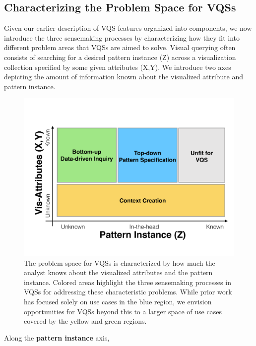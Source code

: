 \subsection{Characterizing the Problem Space for VQSs}
Given our earlier description of VQS features organized into components, we now introduce the three sensemaking processes by characterizing how they fit into different problem areas that VQSs are aimed to solve. Visual querying often consists of searching for a desired pattern instance (Z) across a visualization collection specified by some given attributes (X,Y). We introduce two axes depicting the amount of information known about the visualized attribute and pattern instance.%
\begin{figure}[h!]
  \centering
  \includegraphics[width=0.9\linewidth]{figures/2dmodel.pdf}
  \caption{The problem space for VQSs is characterized by how much the analyst knows about the visualized attributes and the pattern instance. Colored areas highlight the three sensemaking processes in VQSs for addressing these characteristic problems. While prior work has focused solely on use cases in the blue region, we envision opportunities for VQSs beyond this to a larger space of use cases covered by the yellow and green regions.}
  \label{2dmodel}
  \vspace{-10pt}
\end{figure}
\par Along the \textbf{pattern instance} axis,
